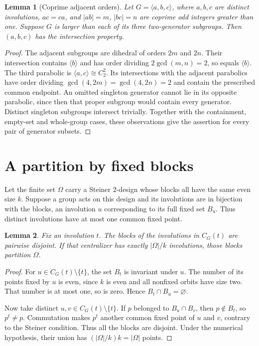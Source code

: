 \documentclass[11pt,a4paper]{article}
\newtheorem{lemma}{Lemma}
\newcommand{\gen}[1]{\langle #1\rangle}
\begin{document}
\begin{lemma}[Coprime adjacent orders]\label{IP}
Let $G=\gen{a,b,c}$, where $a,b,c$ are distinct involutions,
$ac=ca$, and $|ab|=m$, $|bc|=n$ are coprime odd integers greater than
one. Suppose $G$ is larger than each of its three two-generator subgroups.
Then $(a,b,c)$ has the intersection property.
\end{lemma}
\begin{proof}
The adjacent subgroups are dihedral of orders $2m$ and $2n$. Their
intersection contains $\gen b$ and has order dividing $2\gcd(m,n)=2$,
so equals $\gen b$. The third parabolic is $\gen{a,c}\cong C_2^2$.
Its intersections with the adjacent parabolics have order dividing
$\gcd(4,2m)=\gcd(4,2n)=2$ and contain the prescribed common endpoint.
An omitted singleton generator cannot lie in its opposite parabolic,
since then that proper subgroup would contain every generator. Distinct
singleton subgroups intersect trivially. Together with the containment,
empty-set and whole-group cases, these observations give the assertion
for every pair of generator subsets.
\end{proof}

\section{A partition by fixed blocks}
Let the finite set $\Omega$ carry a Steiner $2$-design whose blocks all have the same
even size $k$. Suppose a group acts on this design and its involutions
are in bijection with the blocks, an involution $u$ corresponding to its
full fixed set $B_u$. Thus distinct involutions have at most one common
fixed point.

\begin{lemma}\label{partition}
Fix an involution $t$. The blocks of the involutions in $C_G(t)$ are
pairwise disjoint. If that centralizer has exactly $|\Omega|/k$
involutions, those blocks partition $\Omega$.
\end{lemma}
\begin{proof}
For $u\in C_G(t)\setminus\{t\}$, the set $B_t$ is invariant under $u$.
The number of its points fixed by $u$ is even, since $k$ is even and
all nonfixed orbits have size two. That number is at most one, so is
zero. Hence $B_t\cap B_u=\varnothing$.

Now take distinct $u,v\in C_G(t)\setminus\{t\}$. If $p$ belonged to
$B_u\cap B_v$, then $p\notin B_t$, so $p^t\ne p$. Commutation makes
$p^t$ another common fixed point of $u$ and $v$, contrary to the
Steiner condition. Thus all the blocks are disjoint. Under the numerical
hypothesis, their union has $(|\Omega|/k)k=|\Omega|$ points.
\end{proof}
\end{document}
